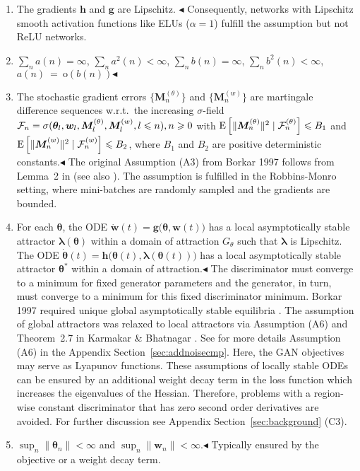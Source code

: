 \documentclass{article}
\newcommand\Bg{\bm{g}}
\newcommand\Bh{\bm{h}}
\newcommand\Bw{\bm{w}}
\newcommand\BM{\bm{M}}
\newcommand\Bla{\bm{\lambda}}
\newcommand\Bth{\bm{\theta}}
\newcommand{\rE}{\mathrm{E}} \newcommand{\rF}{\mathrm{F}}
\newcommand{\Ro}{\mathrm{o}} \newcommand{\Rp}{\mathrm{p}}
\renewcommand{\leq}{\leqslant}
\renewcommand{\geq}{\geqslant}
\begin{document}
\begin{enumerate}[label=\textbf{(A\arabic*)}]
\item The gradients $\Bh$ and  $\Bg$ are Lipschitz. $\blacktriangleleft$
Consequently, networks with Lipschitz smooth activation functions like
ELUs ($\alpha=1$) \cite{Clevert:16}
fulfill the assumption but not ReLU networks.
\item $\sum_{n} a(n) = \infty$, $\sum_{n} a^2(n) <  \infty$,
$\sum_{n} b(n) =  \infty$, $\sum_{n} b^2(n) <  \infty$, $a(n) \ = \ \Ro(b(n))$$\blacktriangleleft$
\item The stochastic gradient errors
$\{\BM^{(\theta)}_n\}$ and $\{\BM^{(w)}_n\}$ are martingale
difference sequences w.r.t.\ the increasing $\sigma$-field
$\cF_n = \sigma(\Bth_l, \Bw_l, \BM^{(\theta)}_{l}, \BM^{(w)}_{l},
l \leq n), n \geq 0$ with
$\rE \left[\|\BM^{(\theta)}_n \|^2 \mid \cF_n^{(\theta)} \right]
\leq  B_1$ and
$\rE \left[\|\BM^{(w)}_n \|^2 \mid \cF_n^{(w)} \right]
 \leq  B_2$, where $B_1$ and $B_2$ are positive deterministic
constants.$\blacktriangleleft$
The original Assumption (A3) from Borkar 1997
follows from Lemma~2 in \cite{Bertsekas:00}
(see also \cite{Ramaswamy:16}).
The assumption is fulfilled in the
Robbins-Monro setting, where mini-batches are randomly
sampled and the gradients are bounded.
\item For each $\Bth$, the ODE
$\dot{\Bw}(t) = \Bg\big(\Bth, \Bw(t)\big)$
has a local asymptotically stable attractor
$\Bla(\Bth)$ within a domain of attraction $G_{\theta}$
such that $\Bla$ is Lipschitz.
The ODE
$\dot{\Bth}(t) = \Bh\big(\Bth(t), \Bla(\Bth(t))\big)$
has a local asymptotically stable
attractor $\Bth^{*}$ within a domain of attraction.$\blacktriangleleft$
The discriminator must converge
to a minimum for fixed generator parameters and
the generator, in turn, must converge to a minimum for this fixed discriminator
minimum.
Borkar 1997 required unique global asymptotically stable equilibria \cite{Borkar:97}.
The assumption of global attractors was relaxed to local attractors via
Assumption (A6) and Theorem~2.7
in Karmakar \& Bhatnagar \cite{Karmakar:17}.
See for more details Assumption (A6) in the Appendix
Section~\ref{sec:addnoisecmp}.
Here, the GAN objectives may serve as Lyapunov functions.
These assumptions of locally stable
ODEs can be ensured by an additional weight decay term in the loss function
which increases the eigenvalues of the Hessian. Therefore, problems with a
region-wise constant discriminator that has zero second order derivatives are
avoided. For further discussion see Appendix Section~\ref{sec:background}
(C3).
\item
$\sup_n \| \Bth_n \| < \infty$ and $\sup_n \| \Bw_n \| <  \infty$.$\blacktriangleleft$
Typically ensured by the objective or a weight decay term.
\end{enumerate}
\end{document}
